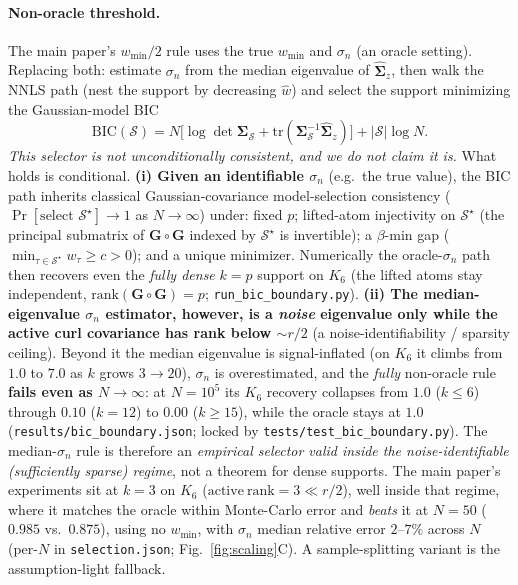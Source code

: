 \documentclass[11pt]{article}
\newcommand{\Scal}{\mathcal{S}}
\begin{document}
\paragraph{Non-oracle threshold.} The main paper's $w_{\min}/2$ rule uses the
true $w_{\min}$ and $\sigma_n$ (an oracle setting). Replacing both: estimate
$\sigma_n$ from the median eigenvalue of $\hat{\bm\Sigma}_z$, then walk the NNLS
path (nest the support by decreasing $\hat w$) and select the support
minimizing the Gaussian-model BIC
\[
\mathrm{BIC}(\Scal)=N\bigl[\log\det\bm\Sigma_\Scal
+\mathrm{tr}(\bm\Sigma_\Scal^{-1}\hat{\bm\Sigma}_z)\bigr]+|\Scal|\log N .
\]
\emph{This selector is not unconditionally consistent, and we do not claim it
is.} What holds is conditional. \textbf{(i) Given an identifiable $\sigma_n$}
(e.g.\ the true value), the BIC path inherits classical Gaussian-covariance
model-selection consistency ($\Pr[\text{select }\Scal^\star]\to1$ as
$N\to\infty$) under: fixed $p$; lifted-atom injectivity on $\Scal^\star$ (the
principal submatrix of $\bm G\!\circ\!\bm G$ indexed by $\Scal^\star$ is
invertible); a $\beta$-min gap ($\min_{\tau\in\Scal^\star}w_\tau\ge c>0$); and a
unique minimizer. Numerically the oracle-$\sigma_n$ path then recovers even the
\emph{fully dense} $k{=}p$ support on $K_6$ (the lifted atoms stay independent,
$\mathrm{rank}(\bm G\!\circ\!\bm G){=}p$;
\texttt{run\_bic\_boundary.py}). \textbf{(ii) The median-eigenvalue $\sigma_n$
estimator, however, is a \emph{noise} eigenvalue only while the active curl
covariance has rank below ${\sim}r/2$} (a noise-identifiability / sparsity
ceiling). Beyond it the median eigenvalue is signal-inflated (on $K_6$ it climbs
from $1.0$ to $7.0$ as $k$ grows $3\to20$), $\sigma_n$ is overestimated, and the
\emph{fully} non-oracle rule \textbf{fails even as $N\to\infty$}: at $N{=}10^5$
its $K_6$ recovery collapses from $1.0$ ($k{\le}6$) through $0.10$ ($k{=}12$) to
$0.00$ ($k{\ge}15$), while the oracle stays at $1.0$
(\texttt{results/bic\_boundary.json}; locked by
\texttt{tests/test\_bic\_boundary.py}). The median-$\sigma_n$ rule is therefore
an \emph{empirical selector valid inside the noise-identifiable (sufficiently
sparse) regime}, not a theorem for dense supports. The main paper's experiments
sit at $k{=}3$ on $K_6$ ($\mathrm{active\ rank}=3\ll r/2$), well inside that
regime, where it matches the oracle within Monte-Carlo error and \emph{beats} it
at $N{=}50$ ($0.985$ vs.\ $0.875$), using no $w_{\min}$, with $\sigma_n$ median
relative error $2$--$7\%$ across $N$ (per-$N$ in \texttt{selection.json};
Fig.~\ref{fig:scaling}C). A sample-splitting variant is the assumption-light
fallback.
\end{document}
